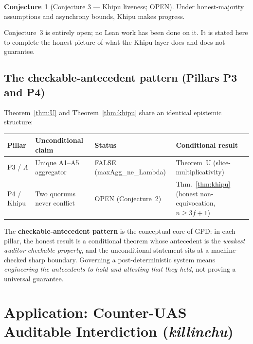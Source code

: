 \documentclass[11pt,letterpaper]{article}
\newcommand{\lean}[1]{{\small\ttfamily #1}}
\theoremstyle{definition}
\newtheorem{conjecture}[theorem]{Conjecture}
\newcommand{\Lam}{\Lambda}
\begin{document}
\begin{conjecture}[Conjecture 3 --- Khipu liveness; OPEN]
\label{conj:liveness}
Under honest-majority assumptions and asynchrony bounds, Khipu makes progress.
\end{conjecture}

\noindent Conjecture~3 is entirely open; no Lean work has been done on it.
It is stated here to complete the honest picture of what the Khipu layer
does and does not guarantee.

\subsection{The checkable-antecedent pattern (Pillars P3 and P4)}

Theorem~\ref{thm:U} and Theorem~\ref{thm:khipu} share an identical epistemic
structure:

\begin{center}\small
\begin{tabular}{@{}p{1.5cm}p{3.1cm}p{3.4cm}p{2.7cm}@{}}
\toprule
\textbf{Pillar} & \textbf{Unconditional claim} & \textbf{Status}
  & \textbf{Conditional result} \\
\midrule
P3 / $\Lam$ & Unique A1--A5 aggregator & FALSE (\lean{maxAgg\_ne\_Lambda})
  & Theorem~U (slice-multiplicativity) \\
P4 / Khipu  & Two quorums never conflict & OPEN (Conjecture~2)
  & Thm.~\ref{thm:khipu} (honest non-equivocation, $n\ge 3f+1$) \\
\bottomrule
\end{tabular}
\end{center}

\noindent The \textbf{checkable-antecedent pattern} is the conceptual core of
GPD: in each pillar, the honest result is a conditional theorem whose antecedent
is the \emph{weakest auditor-checkable property}, and the unconditional statement
sits at a machine-checked sharp boundary.  Governing a post-deterministic system
means \emph{engineering the antecedents to hold and attesting that they held},
not proving a universal guarantee.

\section{Application: Counter-UAS Auditable Interdiction (\emph{killinchu})}
\label{sec:killinchu}
\end{document}
